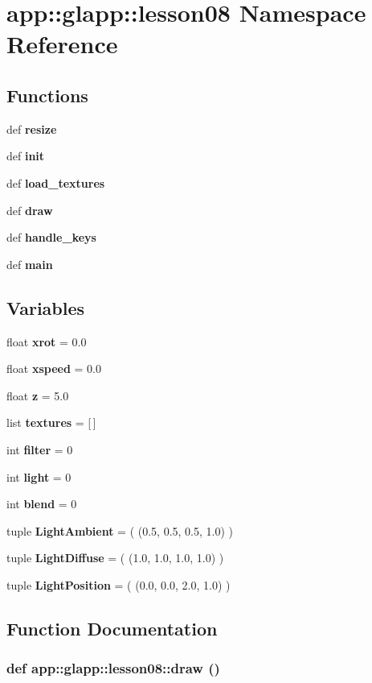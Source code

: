 \section{app::glapp::lesson08 Namespace Reference}
\label{namespaceapp_1_1glapp_1_1lesson08}


\subsection*{Functions}
\begin{CompactItemize}
\item 
def {\bf resize}
\item 
def {\bf init}
\item 
def {\bf load\_\-textures}
\item 
def {\bf draw}
\item 
def {\bf handle\_\-keys}
\item 
def {\bf main}
\end{CompactItemize}
\subsection*{Variables}
\begin{CompactItemize}
\item 
float {\bf xrot} = 0.0
\item 
float {\bf xspeed} = 0.0
\item 
float {\bf z} = 5.0
\item 
list {\bf textures} = [$\,$]
\item 
int {\bf filter} = 0
\item 
int {\bf light} = 0
\item 
int {\bf blend} = 0
\item 
tuple {\bf LightAmbient} = ( (0.5, 0.5, 0.5, 1.0) )
\item 
tuple {\bf LightDiffuse} = ( (1.0, 1.0, 1.0, 1.0) )
\item 
tuple {\bf LightPosition} = ( (0.0, 0.0, 2.0, 1.0) )
\end{CompactItemize}


\subsection{Function Documentation}
\subsubsection{\setlength{\rightskip}{0pt plus 5cm}def app::glapp::lesson08::draw ()}\label{namespaceapp_1_1glapp_1_1lesson08_da97016d4e8d40615d5b0820d1dbfb68}




